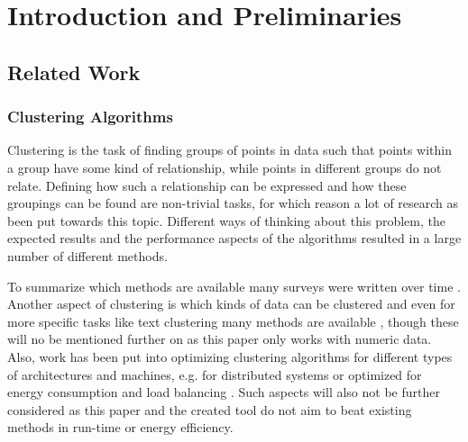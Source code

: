 \documentclass[
	a4paper,
	english,
	twoside,
	openright,               
	11pt                            
	]{report}
\begin{document}




\tableofcontents
 \cleardoublepage
%
%
\listoffigures
\cleardoublepage

\listoftables
\cleardoublepage

\cleardoublepage

 \part{Introduction and Preliminaries}
   \setcounter{page}{1}
 


\chapter{Related Work}\label{cha:related_work}
\section{Clustering Algorithms}

Clustering is the task of finding groups of points in data such that points within a group have some kind of relationship, while points in different groups do not relate. Defining how such a relationship can be expressed and how these groupings can be found are non-trivial tasks, for which reason a lot of research as been put towards this topic. Different ways of thinking about this problem, the expected results and the performance aspects of the algorithms resulted in a large number of different methods. 

 To summarize which methods are available many surveys were written over time \cite{7154919,1427769,7414675,surveyclustering}. Another aspect of clustering is which kinds of data can be clustered and even for more specific tasks like text clustering many methods are available \cite{5982288}, though these will no be mentioned further on as this paper only works with numeric data. Also, work has been put into optimizing clustering algorithms for different types of architectures and machines, e.g. for distributed systems \cite{6322592} or optimized for energy consumption and load balancing \cite{7586361}. Such aspects will also not be further considered as this paper and the created tool do not aim to beat existing methods in run-time or energy efficiency.
\end{document}
